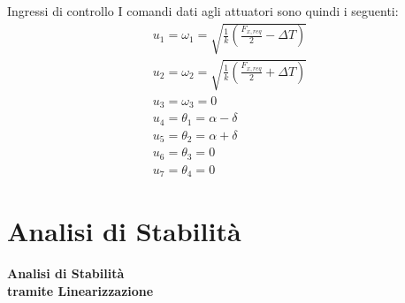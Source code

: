 \documentclass[aspectratio=169]{beamer} %
\begin{document}
\begin{frame}{Ingressi di controllo}
    I comandi dati agli attuatori sono quindi i seguenti:
\begin{gather}
    u_1 = \omega_1 = \sqrt{\frac{1}{k} \left(\frac{F_{x,req}}{2} - \Delta T \right)}\\
    u_2 = \omega_2 = \sqrt{\frac{1}{k} \left(\frac{F_{x,req}}{2} + \Delta T \right)}\\
    u_3 = \omega_3 = 0\\
    u_4 = \theta_1 = \alpha - \delta\\
    u_5 = \theta_2 = \alpha + \delta\\
    u_6 = \theta_3 = 0\\
    u_7 = \theta_4 = 0
\end{gather}
\end{frame}


\section{Analisi di Stabilità}
\begin{frame}
    \vfill
    \begin{center}
        \Huge \textbf{Analisi di Stabilità \\ \vspace{0.2cm} tramite Linearizzazione}
    \end{center}
    \vfill
\end{frame}


\end{document}

